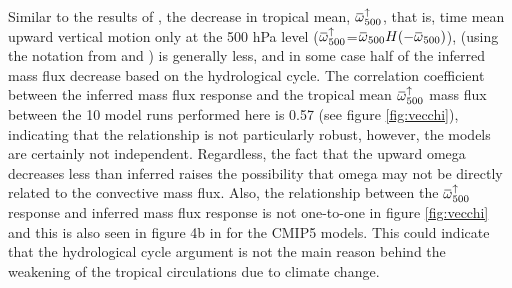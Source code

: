 \documentclass[letterpaper,12pt,titlepage,oneside,final]{book}
\newcommand{\overbar}[1]{\mkern 1.5mu\overline{\mkern-1.5mu#1\mkern-1.5mu}\mkern 1.5mu}
\begin{document}
Similar to the results of \citep{vecchi_global_2007}, the decrease in tropical mean, $\overbar{\omega}_{500}^{\uparrow}$, that is, time mean upward vertical motion only at the 500 hPa level ($\overbar{{\omega}}_{500}^{\uparrow}$=$\overbar{{\omega}}_{500}{H(-\overbar{\omega}_{500})}$), (using the notation from \cite{schneider_water_2010} and \cite{merlis_changes_2011}) is generally less, and in some case half of the inferred mass flux decrease based on the hydrological cycle. The correlation coefficient between the inferred mass flux response and the tropical mean $\overbar{\omega}_{500}^{\uparrow}$ mass flux between the 10 model runs performed here is 0.57 (see figure \ref{fig:vecchi}), indicating that the relationship is not particularly robust, however, the models are certainly not independent. Regardless, the fact that the upward omega decreases less than inferred raises the possibility that omega may not be directly related to the convective mass flux. Also, the relationship between the $\overbar{\omega}_{500}^{\uparrow}$ response and inferred mass flux response is not one-to-one in figure \ref{fig:vecchi} and this is also seen in figure 4b in \citep{vecchi_global_2007} for the CMIP5 models. This could indicate that the hydrological cycle argument is not the main reason behind the weakening of the tropical circulations due to climate change.
\end{document}
